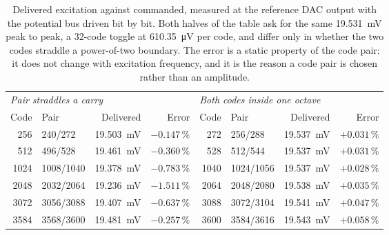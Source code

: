 \begin{table}[htbp]
  \centering
  \caption[{Delivered excitation against commanded, with and without a carry.}]{Delivered
  excitation against commanded, measured at the reference DAC output with the
  potential bus driven bit by bit. Both halves of the table ask for the same
  \SI{19.531}{\milli\volt} peak to peak, a \num{32}-code toggle at
  \SI{610.35}{\micro\volt} per code, and differ only in whether the two codes
  straddle a power-of-two boundary. The error is a static property of the code
  pair: it does not change with excitation frequency, and it is the reason a code
  pair is chosen rather than an amplitude.}
  \label{tab:eis-excitation}
  \begin{tabular}{rlrr@{\hspace{2em}}rlrr}
    \toprule
    \multicolumn{4}{l}{\emph{Pair straddles a carry}} &
    \multicolumn{4}{l}{\emph{Both codes inside one octave}} \\
    \cmidrule(lr){1-4}\cmidrule(lr){5-8}
    Code & Pair & Delivered & Error & Code & Pair & Delivered & Error \\
    \midrule
     256 & 240/272   & \SI{19.503}{\milli\volt} & \(-0.147\,\%\) &  272 & 256/288   & \SI{19.537}{\milli\volt} & \(+0.031\,\%\) \\
     512 & 496/528   & \SI{19.461}{\milli\volt} & \(-0.360\,\%\) &  528 & 512/544   & \SI{19.537}{\milli\volt} & \(+0.031\,\%\) \\
    1024 & 1008/1040 & \SI{19.378}{\milli\volt} & \(-0.783\,\%\) & 1040 & 1024/1056 & \SI{19.537}{\milli\volt} & \(+0.028\,\%\) \\
    2048 & 2032/2064 & \SI{19.236}{\milli\volt} & \(-1.511\,\%\) & 2064 & 2048/2080 & \SI{19.538}{\milli\volt} & \(+0.035\,\%\) \\
    3072 & 3056/3088 & \SI{19.407}{\milli\volt} & \(-0.637\,\%\) & 3088 & 3072/3104 & \SI{19.541}{\milli\volt} & \(+0.047\,\%\) \\
    3584 & 3568/3600 & \SI{19.481}{\milli\volt} & \(-0.257\,\%\) & 3600 & 3584/3616 & \SI{19.543}{\milli\volt} & \(+0.058\,\%\) \\
    \bottomrule
  \end{tabular}
\end{table}
